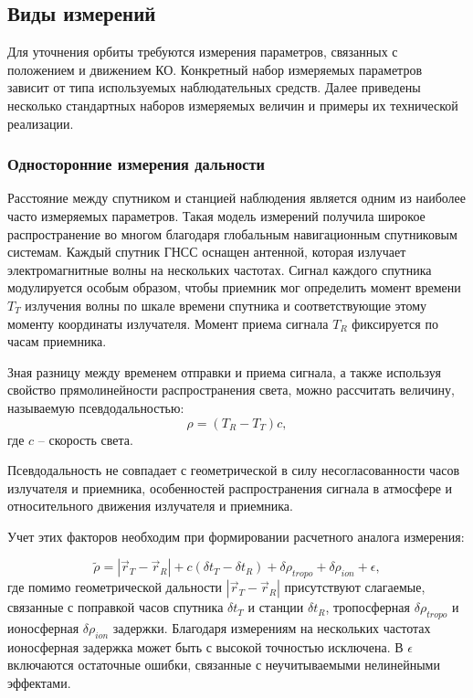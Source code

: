 \subsection{Виды измерений}

Для уточнения орбиты требуются измерения параметров, связанных с положением и движением КО.
Конкретный набор измеряемых параметров зависит от типа используемых наблюдательных средств.
Далее приведены несколько стандартных наборов измеряемых величин и примеры их технической реализации.

\subsubsection{Односторонние измерения дальности}
Расстояние между спутником и станцией наблюдения является одним из наиболее часто измеряемых параметров.
Такая модель измерений получила широкое распространение во многом благодаря глобальным навигационным спутниковым системам.
Каждый спутник ГНСС оснащен антенной, которая излучает электромагнитные волны на нескольких частотах.
Сигнал каждого спутника модулируется особым образом, чтобы приемник мог определить момент времени $T_{T}$ излучения волны по шкале времени спутника
и соответствующие этому моменту координаты излучателя. Момент приема сигнала $T_{R}$ фиксируется по часам приемника.

Зная разницу между временем отправки и приема сигнала, а также используя свойство прямолинейности распространения света, можно 
рассчитать величину, называемую псевдодальностью:
\begin{equation*}
    \rho = (T_{R} - T_{T}) c,
\end{equation*}
где $c$ -- скорость света.

Псевдодальность не совпадает с геометрической в силу несогласованности часов излучателя и приемника, 
особенностей распространения сигнала в атмосфере и относительного движения излучателя и приемника.

Учет этих факторов необходим при формировании расчетного аналога измерения:

\begin{equation*}
    \tilde{\rho} = |\vec{r}_{T} - \vec{r}_{R}| 
                    + c \left( \delta t_{T} - \delta t_{R} \right)
                    + \delta \rho_{tropo} + \delta \rho_{ion} + \epsilon,
\end{equation*}
где помимо геометрической дальности $|\vec{r}_{T} - \vec{r}_{R}|$ присутствуют слагаемые,
связанные с поправкой часов спутника $\delta t_{T}$ и станции $\delta t_{R}$, тропосферная $\delta \rho_{tropo}$ и ионосферная $\delta \rho_{ion}$ задержки.
Благодаря измерениям на нескольких частотах ионосферная задержка может быть с высокой точностью исключена.
В $\epsilon$ включаются остаточные ошибки, связанные с неучитываемыми нелинейными эффектами.

